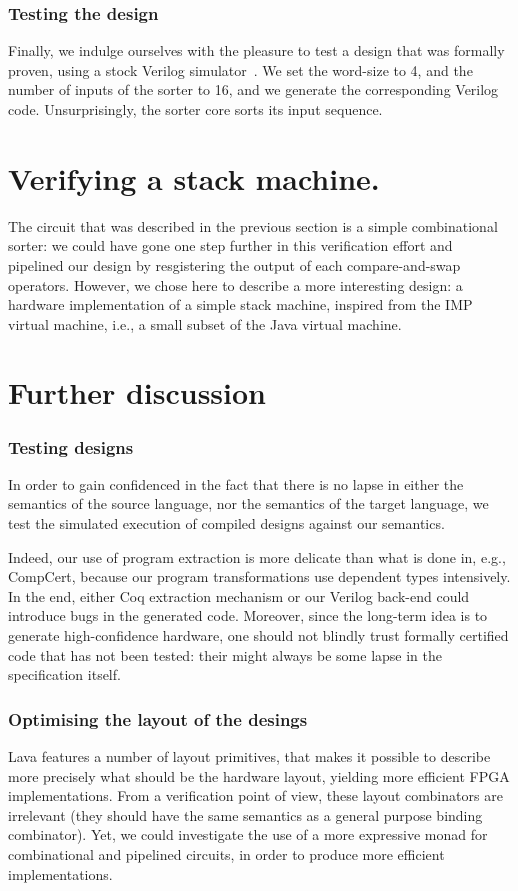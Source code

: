 \documentclass{llncs}
\begin{document}
\subsubsection{Testing the design}
Finally, we indulge ourselves with the pleasure to test a design that
was formally proven, using a stock Verilog
simulator~\cite{iverilog}. We set the word-size to 4, and the number
of inputs of the sorter to 16, and we generate the corresponding
Verilog code. Unsurprisingly, the sorter core sorts its input
sequence.


\section{Verifying a stack machine.}
The circuit that was described in the previous section is a simple
combinational sorter: we could have gone one step further in this
verification effort and pipelined our design by resgistering the
output of each compare-and-swap operators. However, we chose here to
describe a more interesting design: a hardware implementation of a
simple stack machine, inspired from the IMP virtual machine, i.e., a
small subset of the Java virtual machine.

\section{Further discussion}\label{sec:discussion}

\subsubsection{Testing designs}
In order to gain confidenced in the fact that there is no lapse in
either the semantics of the source language, nor the semantics of the
target language, we test the simulated execution of compiled designs
against our semantics. 

Indeed, our use of program extraction is more delicate than what is
done in, e.g., CompCert, because our program transformations use
dependent types intensively. In the end, either Coq extraction
mechanism or our Verilog back-end could introduce bugs in the
generated code.
%
Moreover, since the long-term idea is to generate high-confidence
hardware, one should not blindly trust formally certified code that
has not been tested: their might always be some lapse in the
specification itself.

\subsubsection{Optimising the layout of the desings}
Lava features a number of layout primitives, that makes it possible to
describe more precisely what should be the hardware layout, yielding
more efficient FPGA implementations. From a verification point of
view, these layout combinators are irrelevant (they should have the
same semantics as a general purpose binding combinator). Yet, we could
investigate the use of a more expressive monad for combinational and
pipelined circuits, in order to produce more efficient implementations. 
\end{document}
